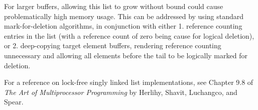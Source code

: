For larger buffers, allowing this list to grow without bound could cause problematically high memory usage. This can be addressed by using standard mark-for-deletion algorithms, in conjunction with either 1. reference counting entries in the list (with a reference count of zero being cause for logical deletion), or 2. deep-copying target element buffers, rendering reference counting unnecessary and allowing all elements before the tail to be logically marked for deletion. 

For a reference on lock-free singly linked list implementations, see Chapter 9.8 of \textit{The Art of Multiprocessor Programming} by Herlihy, Shavit, Luchangco, and Spear.
